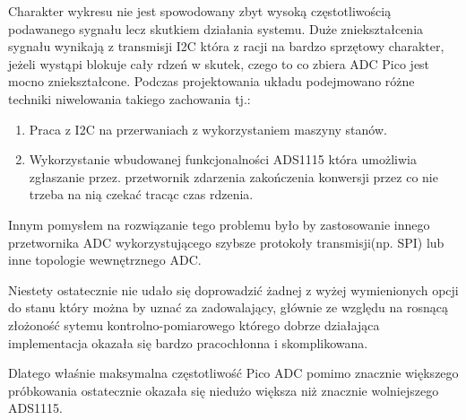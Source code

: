     Charakter wykresu nie jest spowodowany zbyt wysoką częstotliwością podawanego
    sygnału lecz skutkiem działania systemu. Duże zniekształcenia sygnału wynikają
    z transmisji I2C która z racji na bardzo sprzętowy charakter, jeżeli wystąpi blokuje
    cały rdzeń w skutek, czego to co zbiera ADC Pico jest mocno zniekształcone.
    Podczas projektowania układu podejmowano różne techniki niwelowania takiego zachowania tj.: 
    \begin{enumerate}
        \item Praca z I2C na przerwaniach z wykorzystaniem maszyny stanów.
        \item Wykorzystanie wbudowanej funkcjonalności ADS1115 która umożliwia zgłaszanie przez.
        przetwornik zdarzenia zakończenia konwersji przez co nie trzeba na nią czekać tracąc czas
        rdzenia.
    \end{enumerate}

    Innym pomysłem na rozwiązanie tego problemu było by zastosowanie innego przetwornika ADC wykorzystującego szybsze protokoły transmisji(np. SPI)
    lub inne topologie wewnętrznego ADC.

    Niestety ostatecznie nie udało się doprowadzić żadnej z wyżej wymienionych opcji do stanu
    który można by uznać za zadowalający, głównie ze względu na rosnącą złożoność sytemu kontrolno-pomiarowego
    którego dobrze działająca implementacja okazała się bardzo pracochłonna i skomplikowana.
    
    Dlatego właśnie maksymalna częstotliwość Pico ADC pomimo znacznie większego
    próbkowania ostatecznie okazała się niedużo większa niż znacznie wolniejszego ADS1115.  